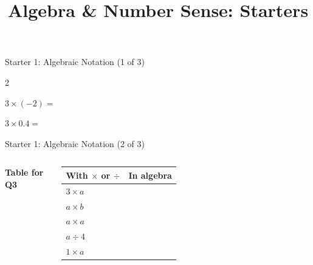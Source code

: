 \documentclass{beamer}
\title{Algebra \& Number Sense: Starters}
\author{}
\date{}
\newcommand{\ablank}[1]{%
  \alt<2>{\textcolor{red}{#1}}{\underline{\phantom{#1}}}%
}
\newcommand{\ashow}[1]{\uncover<2->{\textcolor{red}{\small #1}}}
\newcommand{\tightlist}{%
  \setlength{\itemsep}{0pt}\setlength{\parskip}{0pt}\setlength{\topsep}{0pt}%
}
\newcommand{\dheading}[1]{{\scriptsize\bfseries #1}\par\vspace{0.2em}}
\newcommand{\tblank}[1]{\ablank{\makebox[1.6em]{#1}}}
\newcommand{\tgiven}[1]{\makebox[1.6em]{#1}}
\newcommand{\ealkey}[1]{\textcolor{ealkeycolour}{#1}}
\begin{document}
\frame{\titlepage}

\begin{frame}[t]{Starter 1: \ealkey{Algebraic Notation} (1 of 3)}
\footnotesize
\begin{enumerate}\setcounter{enumi}{0}\tightlist
\begin{multicols}{2}
  \item $3\times(-2)=$\ashow{$-6$}
  \columnbreak
  \item $3\times0.4=$\ashow{$1.2$}
\end{multicols}
\end{enumerate}
\end{frame}

\begin{frame}[t]{Starter 1: \ealkey{Algebraic Notation} (2 of 3)}
\begin{columns}[T,onlytextwidth]
\vspace{-0.4em}
\dheading{Table for Q3}
{\footnotesize
\renewcommand{\arraystretch}{1.25}
\begin{tabular}{@{}l|l@{}}
  With $\times$ or $\div$ & In \ealkey{algebra}\\ \hline
  $3\times a$ & \tgiven{$3a$}\\
  $a\times b$ & \tblank{$ab$}\\
  $a\times a$ & \tblank{$a^2$}\\
  $a\div4$    & \tblank{$\dfrac{a}{4}$}\\[2pt]
  $1\times a$ & \tblank{$a$}
\end{tabular}}


\end{columns}
\end{frame}
\end{document}
